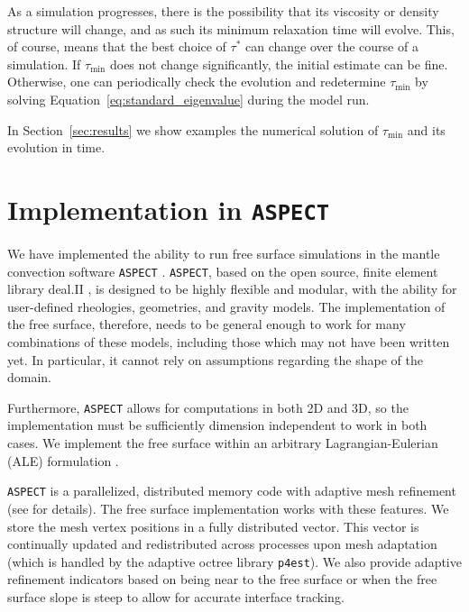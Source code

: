 \documentclass[preprint,12pt,authoryear]{elsarticle}
\begin{document}
As a simulation progresses, there is the possibility that its viscosity or density structure
will change, and as such its minimum relaxation time will evolve.
This, of course, means that the best choice of $\tau^*$ can change over the course of a simulation.
If $\tau_\mathrm{min}$ does not change significantly, the initial estimate can be fine.
Otherwise, one can periodically check the evolution and redetermine $\tau_\mathrm{min}$ by 
solving Equation~\eqref{eq:standard_eigenvalue} during the model run.

In Section~\ref{sec:results} we show examples the numerical solution of $\tau_\mathrm{min}$
and its evolution in time.

\label{sec:dynamic_relaxation}

\section{Implementation in \texttt{ASPECT} }
\label{sec:implementation}
We have implemented the ability to run free surface simulations in the mantle convection software \texttt{ASPECT} \citep{aspectweb,kronbichler2012high}. 
\texttt{ASPECT}, based on the open source, finite element library deal.II \citep{dealII82}, is designed to be highly flexible and modular, with the ability for user-defined rheologies, geometries, and gravity models. 
The implementation of the free surface, therefore, needs to be general enough to work for many combinations of these models, including those 
which may not have been written yet. In particular, it cannot rely on assumptions regarding the shape of the domain.

Furthermore, \texttt{ASPECT} allows for computations in both 2D and 3D, so the implementation must be sufficiently dimension
independent to work in both cases. We implement the free surface within an arbitrary Lagrangian-Eulerian (ALE) formulation
\citep[e.g][]{fullsack1995arbitrary,donea2004encyclopedia}.

\texttt{ASPECT} is a parallelized, distributed memory code with adaptive mesh refinement (see \cite{BBHK10} for details).
The free surface implementation works with these features.  We store the mesh vertex positions 
in a fully distributed vector. This vector is continually updated and redistributed across 
processes upon mesh adaptation (which is handled by the adaptive octree library \texttt{p4est}).
We also provide adaptive refinement indicators based on being near to the free surface or 
when the free surface slope is steep to allow for accurate interface tracking.
\end{document}
